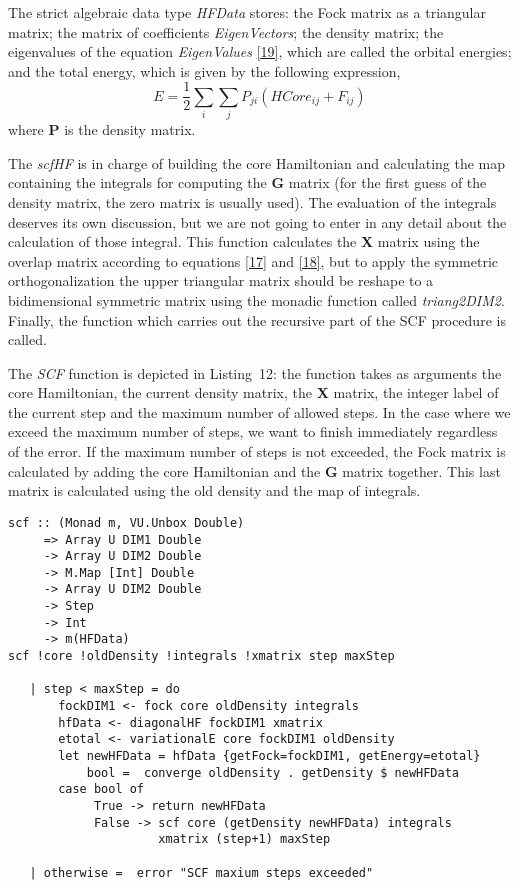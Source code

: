 \documentclass{tmr}
\begin{document}
The strict algebraic data type \textit{HFData} stores: the Fock matrix as a triangular matrix;
the matrix of coefficients \textit{EigenVectors}; the density matrix;
the eigenvalues of the equation \textit{EigenValues} \eqref{19}, which are called the orbital energies;
and the total energy, which is given by the following expression,
\begin{equation}\label{28}
E = \frac{1}{2} \sum_{i}\sum_{j} P_{ji}(HCore_{ij} + F_{ij})
\end{equation}
where \textbf{P} is the density matrix.

The \textit{scfHF} is in charge of building the core Hamiltonian and calculating the map containing
the integrals for computing the \textbf{G} matrix (for the first guess of 
the density matrix, the zero matrix is usually used). The evaluation of the integrals 
deserves its own discussion, but we are not going to enter in any detail 
about the calculation of those integral. This function calculates the 
\textbf{X} matrix using the overlap matrix according to equations \eqref{17}
and \eqref{18}, but to apply the symmetric orthogonalization the upper triangular matrix
should be reshape to a bidimensional symmetric matrix using the monadic function
called \textit{triang2DIM2}. Finally, the function which carries out the recursive part of
the SCF procedure is called. 

The \textit{SCF} function is depicted in Listing~12: the function takes as arguments
the core Hamiltonian, the current density matrix, the \textbf{X} matrix, the integer label
of the current step and the maximum number of allowed steps. In the case where we exceed
the maximum number of steps, we want to finish immediately regardless of the error. If the maximum number of steps is not exceeded, the Fock matrix
is calculated by adding the core Hamiltonian and the \textbf{G} matrix together. This last matrix is
calculated using the old density and the map of integrals.

\begin{lstlisting}[float,captionpos=b,belowcaptionskip=4pt, caption= Self Consistent Field Function]   
scf :: (Monad m, VU.Unbox Double)
     => Array U DIM1 Double
     -> Array U DIM2 Double
     -> M.Map [Int] Double
     -> Array U DIM2 Double
     -> Step
     -> Int
     -> m(HFData)
scf !core !oldDensity !integrals !xmatrix step maxStep
                                                                   
   | step < maxStep = do
       fockDIM1 <- fock core oldDensity integrals
       hfData <- diagonalHF fockDIM1 xmatrix
       etotal <- variationalE core fockDIM1 oldDensity
       let newHFData = hfData {getFock=fockDIM1, getEnergy=etotal}
           bool =  converge oldDensity . getDensity $ newHFData
       case bool of
            True -> return newHFData
            False -> scf core (getDensity newHFData) integrals
                     xmatrix (step+1) maxStep

   | otherwise =  error "SCF maxium steps exceeded"

\end{lstlisting}
\end{document}

